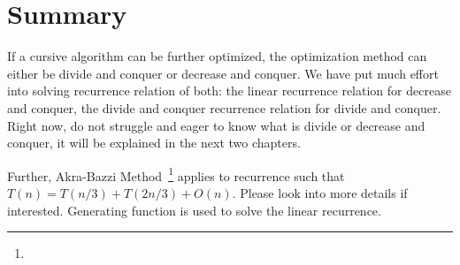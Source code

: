 \documentclass[../main.tex]{subfiles}
\begin{document}
\section{Summary}
If a cursive algorithm can be further optimized, the optimization method can either be divide and conquer or decrease and conquer. We have put much effort into solving recurrence relation of both: the linear recurrence relation for decrease and conquer, the divide and conquer recurrence relation for divide and conquer.  Right now, do not struggle and eager to know what is divide or decrease and conquer, it will be explained in the next two chapters. 

Further, Akra-Bazzi Method~\footnote{} applies to recurrence such that $T(n)=T(n/3)+T(2n/3)+O(n)$. Please look into more details if interested. Generating function is used to solve the linear recurrence.
\end{document}
